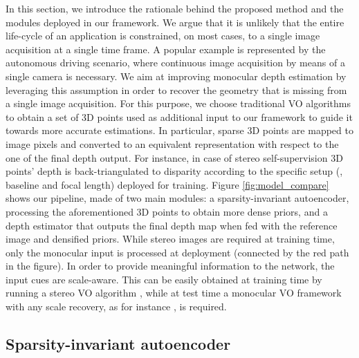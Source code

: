 \documentclass[10pt,twocolumn,letterpaper]{article}
\begin{document}
In this section, we introduce the rationale behind the proposed method and the modules deployed in our framework.
We argue that it is unlikely that the entire life-cycle of an application is constrained, on most cases, to a single image acquisition at a single time frame.
A popular example is represented by the autonomous driving scenario, where continuous image acquisition by means of a single camera is necessary.
We aim at improving monocular depth estimation by leveraging this assumption in order to recover the geometry that is missing from a single image acquisition. 
For this purpose, we choose traditional VO algorithms to obtain a set of 3D points used as additional input to our framework to guide it towards more accurate estimations. In particular, sparse 3D points are mapped to image pixels and converted to an equivalent representation with respect to the one of the final depth output. For instance, in case of stereo self-supervision \cite{Godard1} 3D points' depth is back-triangulated to disparity according to the specific setup (\ie, baseline and focal length) deployed for training.
Figure \ref{fig:model_compare} shows our pipeline, made of two main modules: a sparsity-invariant autoencoder, processing the aforementioned 3D points to obtain more dense priors, and a depth estimator that outputs the final depth map when fed with the reference image and densified priors. While stereo images are required at training time, only the monocular input is processed at deployment (connected by the red path in the figure).
In order to provide meaningful information to the network, the input cues are scale-aware. This can be easily obtained at training time by running a stereo VO algorithm \cite{orbslam2}, while at test time a monocular VO framework with any scale recovery, as for instance \cite{Wang_2018_ICRA,fanani_2017}, is required.

\subsection{Sparsity-invariant autoencoder}
\label{sec:autoencoder}
\end{document}
